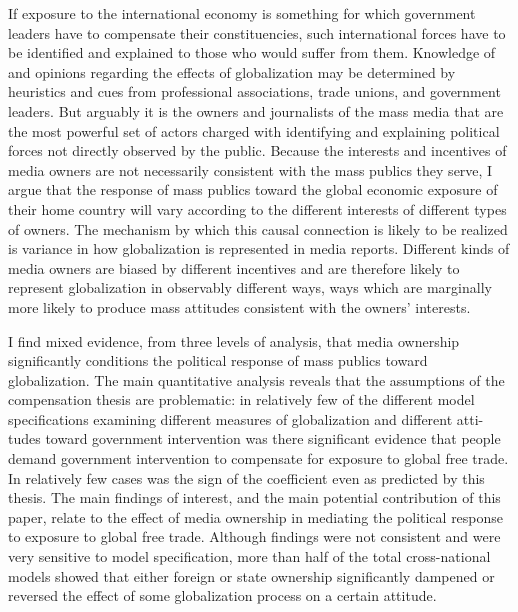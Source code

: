 \documentclass[12pt]{report}
\begin{document}
If exposure to the international economy is something for which government
leaders have to compensate their constituencies, such international
forces have to be identified and explained to those who would suffer
from them. Knowledge of and opinions regarding the effects of globalization
may be determined by heuristics and cues from professional associations,
trade unions, and government leaders. But arguably it is the owners
and journalists of the mass media that are the most powerful set of
actors charged with identifying and explaining political forces not
directly observed by the public. Because the interests and incentives
of media owners are not necessarily consistent with the mass publics
they serve, I argue that the response of mass publics toward the global
economic exposure of their home country will vary according to the
different interests of different types of owners. The mechanism by
which this causal connection is likely to be realized is variance
in how globalization is represented in media reports. Different kinds
of media owners are biased by different incentives and are therefore
likely to represent globalization in observably different ways, ways
which are marginally more likely to produce mass attitudes consistent
with the owners\textquoteright{} interests.

I find mixed evidence, from three levels of analysis, that media ownership
significantly conditions the political response of mass publics toward
globalization. The main quantitative analysis reveals that the assumptions
of the compensation thesis are problematic: in relatively few of the
different model specifications examining different measures of globalization
and different atti- tudes toward government intervention was there
significant evidence that people demand government intervention to
compensate for exposure to global free trade. In relatively few cases
was the sign of the coefficient even as predicted by this thesis.
The main findings of interest, and the main potential contribution
of this paper, relate to the effect of media ownership in mediating
the political response to exposure to global free trade. Although
findings were not consistent and were very sensitive to model specification,
more than half of the total cross-national models showed that either
foreign or state ownership significantly dampened or reversed the
effect of some globalization process on a certain attitude.


\end{document}
